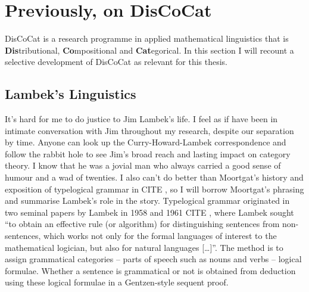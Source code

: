 \section{Previously, on DisCoCat}\label{sec:previously}

DisCoCat is a research programme in applied mathematical linguistics that is \textbf{Dis}tributional, \textbf{Co}mpositional and \textbf{Cat}egorical. In this section I will recount a selective development of DisCoCat as relevant for this thesis.

\subsection{Lambek's Linguistics}

It's hard for me to do justice to Jim Lambek's life. I feel as if have been in intimate conversation with Jim throughout my research, despite our separation by time. Anyone can look up the Curry-Howard-Lambek correspondence and follow the rabbit hole to see Jim's broad reach and lasting impact on category theory. I know that he was a jovial man who always carried a good sense of humour and a wad of twenties. I also can't do better than Moortgat's history and exposition of typelogical grammar in \bR CITE \e, so I will borrow Moortgat's phrasing and summarise Lambek's role in the story. Typelogical grammar originated in two seminal papers by Lambek in 1958 and 1961 \bR CITE \e, where Lambek sought “to obtain an effective rule (or algorithm) for distinguishing sentences from non-sentences, which works not only for the formal languages of interest to the mathematical logician, but also for natural languages […]”. The method is to assign grammatical categories -- parts of speech such as nouns and verbs -- logical formulae. Whether a sentence is grammatical or not is obtained from deduction using these logical formulae in a Gentzen-style sequent proof.

